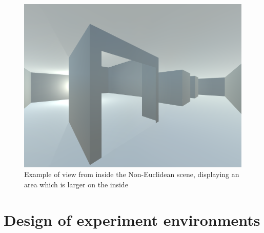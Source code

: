 	\begin{figure}[h]
		\label{design:fig:game}
		\includegraphics[width=1\textwidth]{Images/NE_View}
		\centering
		\caption{Example of view from inside the Non-Euclidean scene, displaying an area which is larger on the inside}
	\end{figure}

	\section[Environment Design]{Design of experiment environments}



